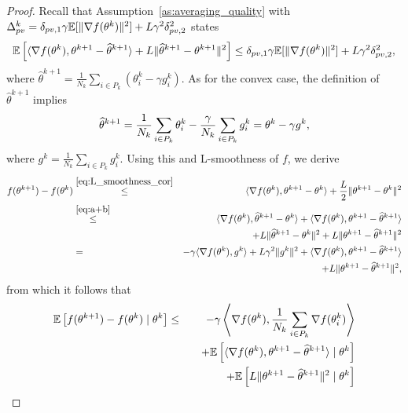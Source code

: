 \begin{proof}
    Recall that Assumption~\ref{as:averaging_quality} with $\Delta_{pv}^k = \delta_{pv,1}\gamma\mathbb{E}[\|\nabla f(\theta^k)\|^2] + L\gamma^2\delta_{pv,2}^2$ states
\begin{equation}
    \mathbb{E}\left[\langle\nabla f(\theta^k), \theta^{k+1}-\widehat{\theta}^{k+1}\rangle + L\|\widehat{\theta}^{k+1} - \theta^{k+1}\|^2\right] \le \delta_{pv,1}\gamma\mathbb{E}[\|\nabla f(\theta^k)\|^2] + L\gamma^2\delta_{pv,2}^2, \label{eq:key_lemma_non_cvx_tech_1}
\end{equation}
where $\widehat \theta^{k+1} = \frac{1}{N_{k}}\sum_{i\in P_{k}}(\theta_i^{k}-\gamma g_i^k)$. As for the convex case, the definition of $\widehat \theta^{k+1}$ implies
\begin{equation}
    \widehat \theta^{k+1} = \frac{1}{N_k}\sum\limits_{i\in P_{k}}\theta_i^{k} - \frac{\gamma}{N_k}\sum\limits_{i\in P_{k}} g_i^k = \theta^k - \gamma g^k,\notag
\end{equation}
where $g^k = \frac{1}{N_k}\sum_{i\in P_k}g_i^k$. Using this and L-smoothness of $f$, we derive
    \begin{eqnarray*}
        f(\theta^{k+1}) - f(\theta^k) &\overset{\eqref{eq:L_smoothness_cor}}{\le}& \langle\nabla f(\theta^k), \theta^{k+1} - \theta^k \rangle + \frac{L}{2}\|\theta^{k+1} - \theta^k\|^2\\
        &\overset{\eqref{eq:a+b}}{\le}& \langle\nabla f(\theta^k), \widehat{\theta}^{k+1} - \theta^k \rangle + \langle\nabla f(\theta^k), \theta^{k+1} - \widehat{\theta}^{k+1} \rangle\\
        &&\quad+ L\|\widehat{\theta}^{k+1} - \theta^k\|^2 + L\|\theta^{k+1} - \widehat{\theta}^{k+1}\|^2\\
        &=& - \gamma\langle\nabla f(\theta^k), g^k\rangle + L\gamma^2\|g^k\|^2 + \langle\nabla f(\theta^k), \theta^{k+1} - \widehat{\theta}^{k+1} \rangle\\
        &&\quad + L\|\theta^{k+1} - \widehat{\theta}^{k+1}\|^2,
    \end{eqnarray*}
    from which it follows that
    \begin{eqnarray}
        \EE\left[f(\theta^{k+1}) - f(\theta^k)\mid \theta^k\right] &\le& -\gamma\left\langle\nabla f(\theta^k), \frac{1}{N_k}\sum\limits_{i\in P_k}\nabla f(\theta_i^k) \right\rangle\notag\\
        &&\quad + \EE\left[\langle\nabla f(\theta^k), \theta^{k+1} - \widehat{\theta}^{k+1} \rangle\mid \theta^k\right]\notag\\
        &&\quad + \EE\left[L\|\theta^{k+1} - \widehat{\theta}^{k+1}\|^2\mid \theta^k\right]\notag\\

\end{eqnarray}
\end{proof}
